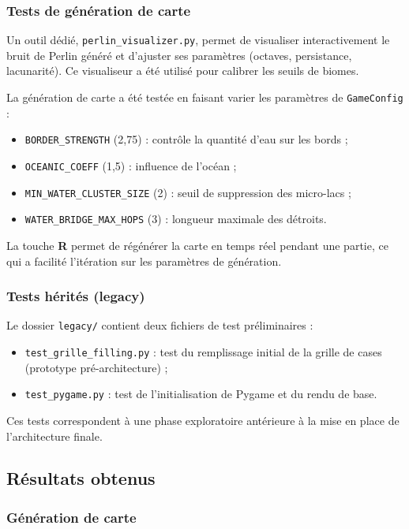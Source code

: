 \documentclass[12pt, a4paper]{article}
\begin{document}
\subsubsection{Tests de génération de carte}

Un outil dédié, \texttt{perlin\_visualizer.py}, permet de visualiser interactivement le
bruit de Perlin généré et d'ajuster ses paramètres (octaves, persistance, lacunarité). Ce
visualiseur a été utilisé pour calibrer les seuils de biomes.

La génération de carte a été testée en faisant varier les paramètres de
\texttt{GameConfig} :
\begin{itemize}
    \item \texttt{BORDER\_STRENGTH} (2,75) : contrôle la quantité d'eau sur les bords ;
    \item \texttt{OCEANIC\_COEFF} (1,5) : influence de l'océan ;
    \item \texttt{MIN\_WATER\_CLUSTER\_SIZE} (2) : seuil de suppression des micro-lacs ;
    \item \texttt{WATER\_BRIDGE\_MAX\_HOPS} (3) : longueur maximale des détroits.
\end{itemize}

La touche \textbf{R} permet de régénérer la carte en temps réel pendant une partie, ce qui
a facilité l'itération sur les paramètres de génération.

\subsubsection{Tests hérités (legacy)}

Le dossier \texttt{legacy/} contient deux fichiers de test préliminaires :
\begin{itemize}
    \item \texttt{test\_grille\_filling.py} : test du remplissage initial de la grille de
    cases (prototype pré-architecture) ;
    \item \texttt{test\_pygame.py} : test de l'initialisation de Pygame et du rendu de base.
\end{itemize}
Ces tests correspondent à une phase exploratoire antérieure à la mise en place de
l'architecture finale.

\subsection{Résultats obtenus}

\subsubsection{Génération de carte}
\end{document}
